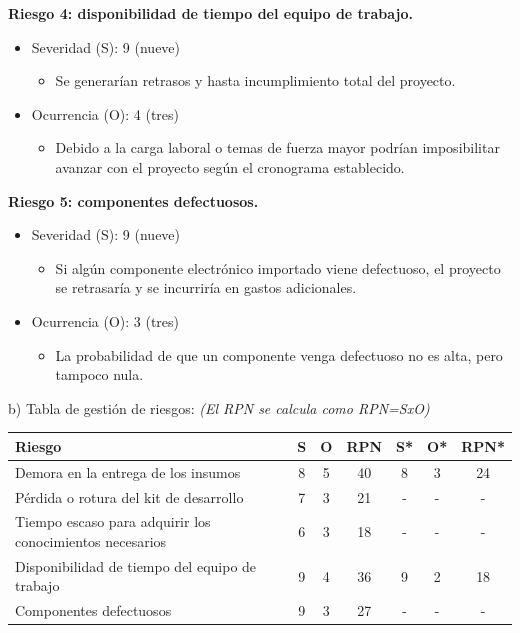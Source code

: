 \documentclass[
11pt, %
]{charter}
\begin{document}
\textbf{Riesgo 4: disponibilidad de tiempo del equipo de trabajo.}
\begin{itemize}
	\item Severidad (S): 9 (nueve)
		\begin{itemize}
			\item Se generarían retrasos y hasta incumplimiento total del proyecto.
		\end{itemize}
	\item Ocurrencia (O): 4 (tres)
		\begin{itemize}
			\item Debido a la carga laboral o temas de fuerza mayor podrían imposibilitar
avanzar con el proyecto según el cronograma establecido.
		\end{itemize}
\end{itemize}

\textbf{Riesgo 5: componentes defectuosos.}
\begin{itemize}
	\item Severidad (S): 9 (nueve)
		\begin{itemize}
			\item Si algún componente electrónico importado viene defectuoso, el proyecto se
retrasaría y se incurriría en gastos adicionales.
		\end{itemize}
	\item Ocurrencia (O): 3 (tres)
		\begin{itemize}
			\item La probabilidad de que un componente venga defectuoso no es alta, pero tampoco nula.
		\end{itemize}
\end{itemize}

b) Tabla de gestión de riesgos:      \textit{(El RPN se calcula como RPN=SxO)}

\begin{table}[htpb]
\centering
\begin{tabularx}{\linewidth}{@{}|X|c|c|c|c|c|c|@{}}
\hline
\rowcolor[HTML]{C0C0C0} 
Riesgo & S & O & RPN & S* & O* & RPN* \\ \hline
Demora en la entrega de los insumos                            &8  &5  &40   &8   &3   &24    \\ \hline
Pérdida o rotura del kit de desarrollo                         &7  &3  &21   &-   &-   &-     \\ \hline
Tiempo escaso para adquirir los conocimientos necesarios       &6  &3  &18   &-   &-   &-     \\ \hline
Disponibilidad de tiempo del equipo de trabajo                 &9  &4  &36   &9   &2   &18    \\ \hline
Componentes defectuosos                                        &9  &3  &27   &-   &-   &-     \\ \hline
\end{tabularx}%
\end{table}
\end{document}
